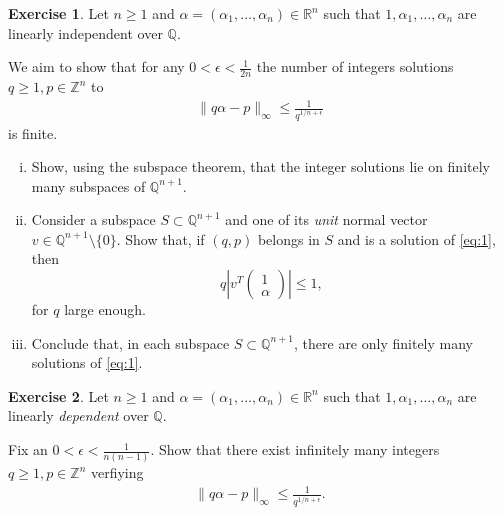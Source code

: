 \documentclass[12pt,a4paper]{article}
\theoremstyle{plain}
\newtheorem*{Sol*}{Solution}
\theoremstyle{definition}
\newtheorem{Ex}{Exercise}
\def \Q {\mathbb Q}
\def \R {\mathbb R}
\def \Z {\mathbb Z}
\newif\ifsolutions
\newcommand{\exercise}[2]{
			\begin{Ex} #1 \end{Ex}
			\ifsolutions  \begin{Sol*} #2 \end{Sol*} \bigskip \else \bigskip  \fi
		}
\begin{document}
\exercise{\label{ex:1}
	Let $n\geq1$ and $\alpha = (\alpha_1, \dots, \alpha_n) \in \R^n$ such that $1, \alpha_1, \dots, \alpha_n$ are linearly independent over $\Q$.

	We aim to show that for any $0 < \epsilon < \frac{1}{2n}$ the number of integers solutions $q\geq1, p\in\Z^n$ to
		\begin{gather}
			 \| q \alpha - p \|_\infty \leq \frac{1}{q^{1/n + \epsilon}} \label{eq:1}
		\end{gather}
	is finite.

	\begin{enumerate}[i)]
		\item Show, using the subspace theorem, that the integer solutions lie on finitely many subspaces of $\Q^{n+1}$.

		\item Consider a subspace $S \subset \Q^{n+1}$ and one of its \emph{unit} normal vector $v \in \Q^{n+1} \setminus\{0\}$.
			Show that, if $(q, p)$ belongs in $S$ and is a solution of \eqref{eq:1}, then
				\[ q \left| v^T \begin{pmatrix}1 \\ \alpha \end{pmatrix} \right| \leq 1, \]
			for $q$ large enough.
		
		\item Conclude that, in each subspace $S \subset \Q^{n+1}$, there are only finitely many solutions of \eqref{eq:1}.

	\end{enumerate}
}
{}


\exercise{
	Let $n\geq1$ and $\alpha = (\alpha_1, \dots, \alpha_n) \in \R^n$ such that $1, \alpha_1, \dots, \alpha_n$ are linearly \emph{dependent} over $\Q$.

	Fix an $0 < \epsilon < \frac{1}{n(n-1)}$.
	Show that there exist infinitely many integers $q\geq1, p\in\Z^n$ verfiying
		\begin{gather*}
			 \| q \alpha - p \|_\infty \leq \frac{1}{q^{1/n + \epsilon}}.
		\end{gather*}
}
{}
\end{document}
